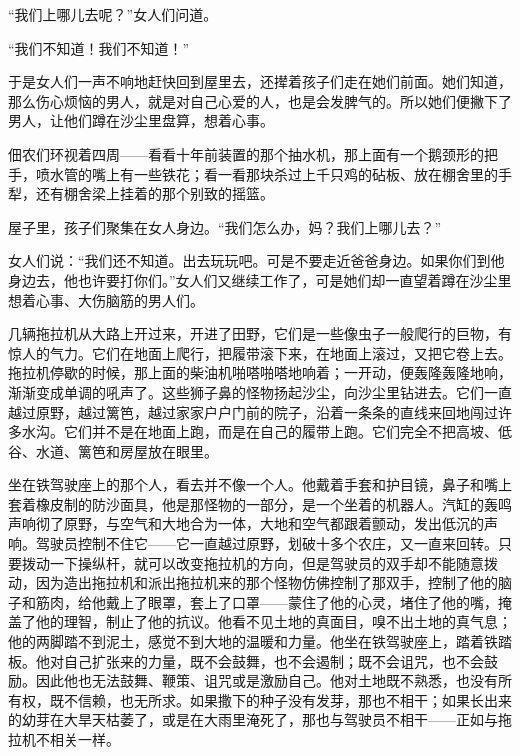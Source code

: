 \documentclass[12pt,UTF-8,openany]{ctexbook}
\begin{document}
\begin{large}
    “我们上哪儿去呢？”女人们问道。
    
    “我们不知道！我们不知道！”
    
    于是女人们一声不响地赶快回到屋里去，还撵着孩子们走在她们前面。她们知道，那么伤心烦恼的男人，就是对自己心爱的人，也是会发脾气的。所以她们便撇下了男人，让他们蹲在沙尘里盘算，想着心事。
    
    佃农们环视着四周——看看十年前装置的那个抽水机，那上面有一个鹅颈形的把手，喷水管的嘴上有一些铁花；看一看那块杀过上千只鸡的砧板、放在棚舍里的手犁，还有棚舍梁上挂着的那个别致的摇篮。
    
    屋子里，孩子们聚集在女人身边。“我们怎么办，妈？我们上哪儿去？”
    
    女人们说：“我们还不知道。出去玩玩吧。可是不要走近爸爸身边。如果你们到他身边去，他也许要打你们。”女人们又继续工作了，可是她们却一直望着蹲在沙尘里想着心事、大伤脑筋的男人们。
    
    几辆拖拉机从大路上开过来，开进了田野，它们是一些像虫子一般爬行的巨物，有惊人的气力。它们在地面上爬行，把履带滚下来，在地面上滚过，又把它卷上去。拖拉机停歇的时候，那上面的柴油机啪嗒啪嗒地响着；一开动，便轰隆轰隆地响，渐渐变成单调的吼声了。这些狮子鼻的怪物扬起沙尘，向沙尘里钻进去。它们一直越过原野，越过篱笆，越过家家户户门前的院子，沿着一条条的直线来回地闯过许多水沟。它们并不是在地面上跑，而是在自己的履带上跑。它们完全不把高坡、低谷、水道、篱笆和房屋放在眼里。
    
    坐在铁驾驶座上的那个人，看去并不像一个人。他戴着手套和护目镜，鼻子和嘴上套着橡皮制的防沙面具，他是那怪物的一部分，是一个坐着的机器人。汽缸的轰鸣声响彻了原野，与空气和大地合为一体，大地和空气都跟着颤动，发出低沉的声响。驾驶员控制不住它——它一直越过原野，划破十多个农庄，又一直来回转。只要拨动一下操纵杆，就可以改变拖拉机的方向，但是驾驶员的双手却不能随意拨动，因为造出拖拉机和派出拖拉机来的那个怪物仿佛控制了那双手，控制了他的脑子和筋肉，给他戴上了眼罩，套上了口罩——蒙住了他的心灵，堵住了他的嘴，掩盖了他的理智，制止了他的抗议。他看不见土地的真面目，嗅不出土地的真气息；他的两脚踏不到泥土，感觉不到大地的温暖和力量。他坐在铁驾驶座上，踏着铁踏板。他对自己扩张来的力量，既不会鼓舞，也不会遏制；既不会诅咒，也不会鼓励。因此他也无法鼓舞、鞭策、诅咒或是激励自己。他对土地既不熟悉，也没有所有权，既不信赖，也无所求。如果撒下的种子没有发芽，那也不相干；如果长出来的幼芽在大旱天枯萎了，或是在大雨里淹死了，那也与驾驶员不相干——正如与拖拉机不相关一样。
    

\end{large}
\end{document}
